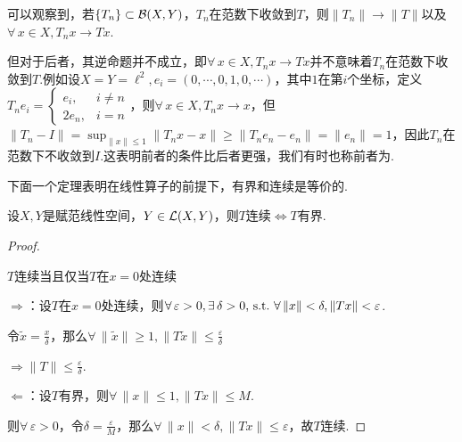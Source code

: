 可以观察到，若$\{T_n\}\subset\mathcal{B}(X,Y)$，$T_n$在范数下收敛到$T$，则$\|T_n\|\to\|T\|$以及$\forall\, x\in X,T_n x\to Tx$.\par
但对于后者，其逆命题并不成立，即$\forall\, x\in X,T_n x\to Tx$并不意味着$T_n$在范数下收敛到$T$.例如设$X=Y=\ell^2,e_i=(0,\cdots,0,1,0,\cdots)$，其中$1$在第$i$个坐标，定义$T_n e_i=\begin{cases}
    e_i,&i\neq n\\
    2e_n,&i=n
\end{cases}$，则$\forall\, x\in X,T_n x\to x$，但$\|T_n-I\|=\sup_{\|x\|\leq 1}\|T_n x-x\|\geq \|T_n e_n-e_n\|=\|e_n\|=1$，因此$T_n$在范数下不收敛到$I$.这表明前者的条件比后者更强，我们有时也称前者为.\par
下面一个定理表明在线性算子的前提下，有界和连续是等价的.\par
\begin{theorem}[]
    设$X,Y$是赋范线性空间，$Y\in\mathcal{L}(X,Y)$，则$T$连续$\iff$$T$有界.
\end{theorem}
\begin{proof}
    \begin{claim*}
        $T$连续当且仅当$T$在$x=0$处连续
    \end{claim*}
    $\Rightarrow$：设$T$在$x=0$处连续，则$\forall\,\varepsilon>0,\exists\, \delta>0,\operatorname{\,\text{s.t.}}\,\forall\,\|x\|<\delta,\|Tx\|<\varepsilon$.\par
    令$\tilde{x}=\frac{x}{\delta}$，那么$\forall\, \|\tilde{x}\|\geq 1,\|T\tilde{x}\|\leq\frac{\varepsilon}{\delta}$\par
    $\Rightarrow \|T\|\leq \frac{\varepsilon}{\delta}$.\par
    $\Leftarrow$：设$T$有界，则$\forall\, \|x\|\leq 1,\|Tx\|\leq M$.\par
    则$\forall\, \varepsilon>0$，令$\delta=\frac{\varepsilon}{M}$，那么$\forall\,\|x\|<\delta,\|Tx\|\leq\varepsilon$，故$T$连续.
\end{proof}\par

